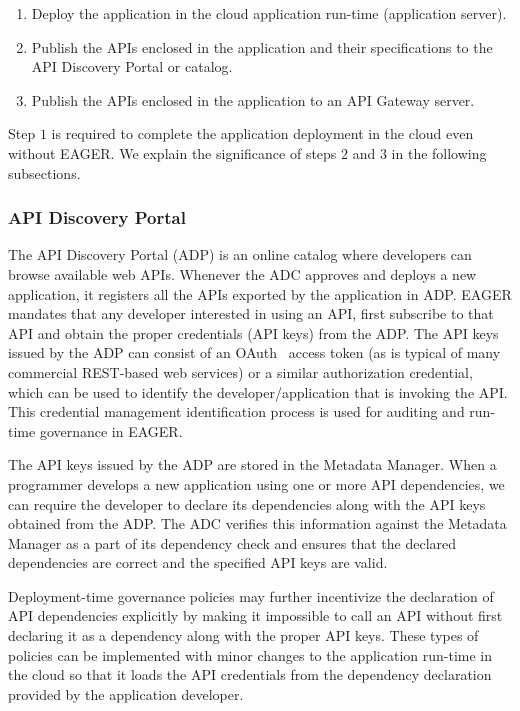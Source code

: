 \begin{enumerate}
\vspace{0.05in}
\item Deploy the application in the cloud application run-time (application server).
\vspace{0.05in}
\item Publish the APIs enclosed in the application and their specifications to
the API Discovery Portal or catalog.
\vspace{0.05in}
\item Publish the APIs enclosed in the application to an API Gateway server.
\vspace{0.05in}
\end{enumerate}

Step $1$ is required to complete the application deployment in the cloud even
without EAGER. We explain the significance of steps $2$ and $3$ in the 
following subsections.

\subsubsection{API Discovery Portal} 
The API Discovery Portal (ADP) is an online
catalog where developers can browse available web APIs. Whenever the ADC
approves and deploys a new application, it registers all the APIs exported by
the application in ADP.  EAGER mandates that any developer interested in using
an API, first subscribe to that API and obtain the proper credentials (API
keys) from the ADP. The API keys issued by the ADP can consist of an
OAuth~\cite{oauth2}
access
token (as is typical of many commercial REST-based web services) 
or a similar authorization credential, which can be used to identify the
developer/application that is invoking the API. This credential management
identification process is used for auditing and run-time governance in EAGER.

The API keys issued by the ADP are stored in the Metadata Manager. When a
programmer develops a new application using one or more API dependencies, we
can require the developer to declare its dependencies along with the API
keys obtained from the ADP. The ADC verifies this information against
the Metadata Manager as a part of its dependency check and ensures that the
declared dependencies are correct and the specified API keys are valid. 

Deployment-time governance policies
may further incentivize the declaration of API 
dependencies explicitly by making it 
impossible to call an API without first declaring it as a dependency along
with the proper API keys. These types of policies can be implemented
with minor changes to the
application run-time in the cloud so that it loads the API credentials from
the dependency declaration provided by the application developer.

